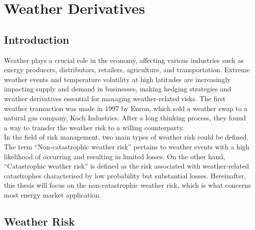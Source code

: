 %

\chapter{Weather Derivatives}
\label{ch:weather_derivatives}

\glsresetall

\section{Introduction}
\label{sec:weather_intro}

    Weather plays a crucial role in the economy, affecting various industries such as energy producers,
    distributors, retailers, agriculture, and transportation.
    Extreme weather events and temperature volatility at high latitudes are increasingly impacting supply and demand
    in businesses, making hedging strategies and weather derivatives essential for managing weather-related risks.
    The first weather transaction was made in 1997 by Enron,
    which sold a weather swap to a natural gas company, Koch Industries.
    After a long thinking process,
    they found a way to transfer the weather risk to a willing counterparty\cite{barrieu_primer_2010}.\\

    In the field of risk management, two main types of weather risk could be defined\cite{leggio_using_2007}.
    The term ``Non-catastrophic weather risk'' pertains to weather events with a high likelihood
    of occurring and resulting in limited losses.
    On the other hand, ``Catastrophic weather risk'' is defined as the risk associated with weather-related catastrophes
    characterised by low probability but substantial losses.
    Hereinafter, this thesis will focus on the non-catastrophic weather risk,
    which is what concerns most energy market application.


\section{Weather Risk}
\label{sec:weather_risk}

